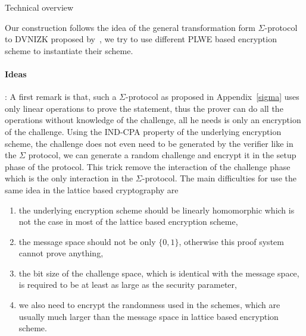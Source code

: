 \begin{subsection}{Technical overview}

  Our construction follows the idea of the general transformation form $\Sigma$-protocol to DVNIZK proposed by~\cite{DBLP:conf/pkc/ChaidosG15},
  we try to use different PLWE based encryption scheme to instantiate their scheme.

  \paragraph{Ideas}: A first remark is that, such a $\Sigma$-protocol as proposed in Appendix~\ref{sigma} uses only linear operations to prove the statement,
    thus the prover can do all the operations without knowledge of the challenge,
    all he needs is only an encryption of the challenge.
    Using the IND-CPA property of the underlying encryption scheme,
    the challenge does not even need to be generated by the verifier like in the $\Sigma$ protocol,
    we can generate a random challenge and encrypt it in the setup phase of the protocol.
    This trick remove the interaction of the challenge phase which is the only interaction in the $\Sigma$-protocol.
    The main difficulties for use the same idea in the lattice based cryptography are
    \begin{enumerate}
    \item the underlying encryption scheme should be linearly homomorphic which is not the case in most of the lattice based encryption scheme,
    \item the message space should not be only $\{0,1\}$, otherwise this proof system cannot prove anything,
    \item the bit size of the challenge space, which is identical with the message space, is required to be at least as large as the security parameter,
    \item we also need to encrypt the randomness used in the schemes, which are usually much larger than the message space in lattice based encryption scheme.
    \end{enumerate}  
  
\end{subsection}




